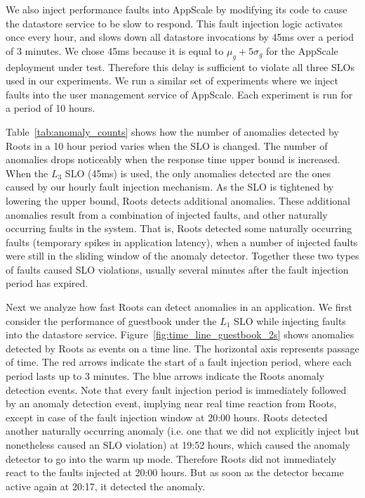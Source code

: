 We also inject performance faults into AppScale by modifying its code
to cause the datastore service to be slow to respond.
This fault injection logic activates once every hour, and
slows down all datastore invocations by 45ms over a period of 3 minutes.
We chose 45ms because it is equal 
to $\mu_g + 5\sigma_g$ for the AppScale deployment under test. 
Therefore this delay is sufficient to violate all three SLOs used in our experiments. 
We run a similar set of experiments where we inject faults into the user management service of
AppScale. Each experiment is run for a period of 10 hours.

Table~\ref{tab:anomaly_counts} shows how the number of anomalies detected by 
Roots in a 10 hour period varies when the SLO is changed. The number of anomalies
drops noticeably when the response time upper bound is increased. When the $L_3$
SLO (45ms) is used, the only anomalies detected are the ones
caused by our hourly fault injection mechanism. As the SLO is tightened by lowering the upper bound,
Roots detects additional anomalies. These additional anomalies
result from a combination of injected faults, and other naturally occurring faults
in the system. That is, Roots detected some naturally occurring
faults (temporary spikes in application latency), when a number of injected faults
were still in the sliding window of the anomaly detector. Together these two types of
faults caused SLO violations, usually several minutes after the fault injection period
has expired.

Next we analyze how fast Roots can detect anomalies in an application. We
first consider the performance of guestbook under the $L_1$ SLO while 
injecting faults into the datastore service. Figure~\ref{fig:time_line_guestbook_2s} shows
anomalies detected by Roots as events on a time line. The horizontal axis represents 
passage of time. The red arrows indicate the start of a fault injection period, where each
period lasts up to 3 minutes.
The blue arrows indicate the Roots anomaly detection events.
Note that every fault injection period is immediately followed by an anomaly
detection event, implying near real time reaction from Roots, except in case of the fault
injection window at 20:00 hours. Roots detected another naturally occurring anomaly
(i.e. one
that we did not explicitly inject but nonetheless caused an SLO violation) at 19:52 hours,
which caused the anomaly detector to go into the warm up mode. Therefore Roots
did not immediately react to the faults injected at 20:00 hours. But as soon as the detector became
active again at 20:17, it detected the anomaly.

